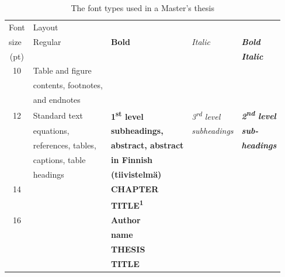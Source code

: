 \begin{table}[!ht]
  \def\arraystretch{1.1}%
  \begin{center}
    \caption{The font types used in a Master’s thesis}
    \label{tab:sample_table}
    \begin{tabular}{| c | l | l | l | l |}
      \hline
      \multicolumn{1}{|l|}{Font}  & \multicolumn{4}{l|}{Layout}
      \\\cline{2-5} \multicolumn{1}{|l|}{size} & Regular &
      \textbf{Bold} & \textit{Italic} & \textbf{\textit{Bold}} \\(pt)
      &  &  &  & \textbf{\textit{Italic}}\\
      \hline
      10 &  {\fontsize{10}{12pt}\selectfont Table and figure} &  &  &  \\
      &  {\fontsize{10}{12pt}\selectfont contents, footnotes,} &  &  &  \\
      &  {\fontsize{10}{12pt}\selectfont and endnotes} &  &  &  \\
      \hline
      12 & Standard text &  \textbf{1\textsuperscript{st} level} &
      \textit{3\textsuperscript{rd} level} &
      \textbf{\textit{2\textsuperscript{nd} level}}\\
      &  equations, &  \textbf{subheadings,} &  \textit{subheadings}
      &  \textbf{\textit{sub-}} \\
      & references, tables, & \textbf{abstract, abstract} &  &
      \textbf{\textit{headings}} \\
      & captions, table & \textbf{in Finnish} &  &  \\
      & headings & \textbf{(tiivistelmä)} &  &  \\
      \hline
      \rule{0pt}{0.8\normalbaselineskip}
      14 &  & {\fontsize{14}{17pt}\selectfont \textbf{CHAPTER}} &  &  \\
      &  & {\fontsize{14}{17pt}\selectfont
      \textbf{TITLE\textsuperscript{1}}} &  &  \\
      \hline
      \rule{0pt}{1.0\normalbaselineskip}
      16 &  & {\fontsize{16}{19pt}\selectfont \textbf{Author}} &  &  \\
      &  & {\fontsize{16}{19pt}\selectfont \textbf{name}} &  &  \\
      \hline
      \rule{0pt}{1.1\normalbaselineskip}
      {\fontsize{16}{19pt}\selectfont 18} &  &
      {\fontsize{18}{22pt}\selectfont \textbf{THESIS}} &  &  \\
      &  & {\fontsize{18}{22pt}\selectfont \textbf{TITLE}} &  &  \\
      \hline
    \end{tabular}
    \vspace{6pt}


\end{center}
\end{table}
